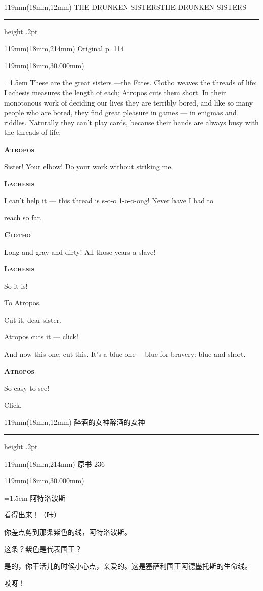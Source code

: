 \documentclass{article}
\newcommand{\ENsetup}{\normalfont\color{ink}\fontsize{11}{16.5}\selectfont\emergencystretch=1.5em}
\newcommand{\ZHsetup}{\normalfont\color{ink}\fontsize{10.5}{17}\selectfont\emergencystretch=1.5em}
\newcommand{\ENspeaker}[1]{{\fontsize{9.8}{13}\selectfont\scshape\bfseries #1}\par\vspace{3pt}}
\newcommand{\ZHspeaker}[1]{{\hei\fontsize{10.3}{13}\selectfont #1}\par\vspace{3pt}}
\newcommand{\Block}[3]{\begin{textblock*}{119mm}(18mm,#1mm){#2 #3\par}\end{textblock*}}
\newcommand{\Heading}[3]{%
  \begin{textblock*}{119mm}(18mm,12mm)
    \color{quiet}\fontsize{7.5}{10}\selectfont
    #1\hfill #2\par\vspace{3mm}\hrule height .2pt
  \end{textblock*}
  \begin{textblock*}{119mm}(18mm,214mm)
    \color{quiet}\fontsize{7}{10}\selectfont #3\hfill\thepage
  \end{textblock*}
}
\begin{document}
\newpage
\null
\Heading{THE DRUNKEN SISTERS}{THE DRUNKEN SISTERS}{Original p. 114}
\Block{30.000}{\ENsetup}{\sloppy
These are the great sisters —the Fates. Clotho weaves the threads of life; Lachesis measures the length of each; Atropos cuts them short. In their monotonous work of deciding our lives they are terribly bored, and like so many people who are bored, they find great pleasure in games — in enigmas and riddles. Naturally they can't play cards, because their hands are always busy with the threads of life.\par\vspace{2pt}
\ENspeaker{Atropos}
Sister! Your elbow! Do your work without striking me.\par\vspace{2pt}
\ENspeaker{Lachesis}
I can't help it — this thread is s-o-o 1-o-o-ong! Never have I had to\par\vspace{2pt}
reach so far.\par\vspace{2pt}
\ENspeaker{Clotho}
Long and gray and dirty! All those years a slave!\par\vspace{2pt}
\ENspeaker{Lachesis}
So it is!\par\vspace{2pt}
To Atropos.\par\vspace{2pt}
Cut it, dear sister.\par\vspace{2pt}
Atropos cuts it — click!\par\vspace{2pt}
And now this one; cut this. It's a blue one— blue for bravery: blue and short.\par\vspace{2pt}
\ENspeaker{Atropos}
So easy to see!\par\vspace{2pt}
Click.\par\vspace{2pt}}
\newpage
\null
\Heading{醉酒的女神}{醉酒的女神}{原书 236}
\Block{30.000}{\ZHsetup}{\ZHspeaker{阿特洛波斯}看得出来！{\kai （咔）}\par \vspace{2.2mm}\ZHspeaker{拉刻西斯}你差点剪到那条紫色的线，阿特洛波斯。\par \vspace{2.2mm}\ZHspeaker{阿特洛波斯}这条？紫色是代表国王？\par \vspace{2.2mm}\ZHspeaker{拉刻西斯}是的，你干活儿的时候小心点，亲爱的。这是塞萨利国王阿德墨托斯的生命线。\par \vspace{2.2mm}\ZHspeaker{阿波罗}{\kai （在一旁）}哎呀！\par }
\end{document}
